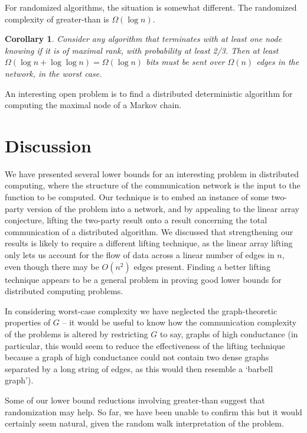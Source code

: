 \documentclass[twocolumn]{article}
\newtheorem{corollary}{Corollary}
\begin{document}
For randomized algorithms, the situation is somewhat different. The randomized complexity of greater-than is $\Omega(\log n)$.
\begin{corollary}
Consider any algorithm that terminates with at least one node knowing if it is of maximal rank, with probability at least 2/3. Then at least $\Omega(\log n + \log \log n)=\Omega(\log n)$ bits must be sent over $\Omega(n)$ edges in the network, in the worst case.
\end{corollary}

An interesting open problem is to find a distributed deterministic algorithm for computing the maximal node of a Markov chain.

\section{Discussion}
\label{section:conclusion}

We have presented several lower bounds for an interesting problem in distributed computing, where the structure of the communication network is the input to the function to be computed. Our technique is to embed an instance of some two-party version of the problem into a network, and by appealing to the linear array conjecture, lifting the two-party result onto a result concerning the total communication of a distributed algorithm. We discussed that strengthening our results is likely to require a different lifting technique, as the linear array lifting only lets us account for the flow of data across a linear number of edges in $n$, even though there may be $O(n^2)$ edges present. Finding a better lifting technique appears to be a general problem in proving good lower bounds for distributed computing problems.

In considering worst-case complexity we have neglected the graph-theoretic properties of $G$ -- it would be useful to know how the communication complexity of the problems is altered by restricting $G$ to say, graphs of high conductance (in particular, this would seem to reduce the effectiveness of the lifting technique because a graph of high conductance could not contain two dense graphs separated by a long string of edges, as this would then resemble a `barbell graph').

Some of our lower bound reductions involving greater-than suggest that randomization may help. So far, we have been unable to confirm this but it would certainly seem natural, given the random walk interpretation of the problem.
 
\end{document}
